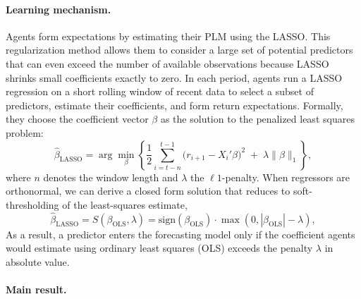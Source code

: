 \documentclass[11pt]{article}
\begin{document}
\paragraph{Learning mechanism.}

Agents form expectations by estimating their PLM using the LASSO.
This regularization method allows them to consider a large set of potential predictors that can even exceed the number of available observations because LASSO shrinks small coefficients exactly to zero.
In each period, agents run a LASSO regression on a short rolling window of recent data to select a subset of predictors, estimate their coefficients, and form return expectations.
Formally, they choose the coefficient vector $\beta$ as the solution to the penalized least squares problem:
\begin{equation}
\hat{\beta}_{\text{LASSO}}  = \arg\min_{\beta}\left\{\frac{1}{2}\sum_{i=t-n}^{t-1}\big(r_{i+1}-X_i'\beta\big)^2
\;+\;\lambda \|\beta\|_1\right\},
\end{equation}
where $n$ denotes the window length and $\lambda$ the $\ell 1$-penalty. 
When regressors are orthonormal, we can derive a closed form solution that reduces to soft-thresholding of the least-squares estimate,
\begin{equation}\label{eq:lasso_from_ols}
\hat{\beta}_{\text{LASSO}} = S(\beta_{\text{OLS}}, \lambda) = \textrm{sign}(\beta_{\text{OLS}}) \cdot \max\left(0, |\beta_{\text{OLS}}| - \lambda\right),
\end{equation}
As a result, a predictor enters the forecasting model only if the coefficient agents would estimate using ordinary least squares (OLS) exceeds the penalty $\lambda$ in absolute value.

\paragraph{Main result.}
\end{document}
